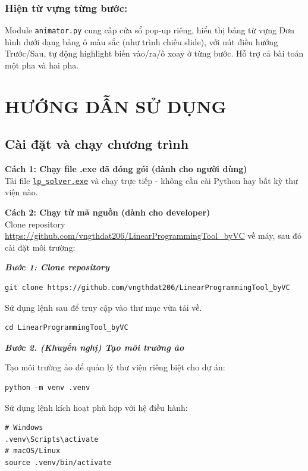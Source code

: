\documentclass[12pt,a4paper]{article}
\begin{document}
\subsubsection*{Hiện từ vựng từng bước:} Module \texttt{animator.py} cung cấp cửa sổ pop-up riêng, hiển thị bảng từ vựng Đơn hình dưới dạng bảng ô màu sắc (như trình chiếu slide), với nút điều hướng Trước/Sau, tự động highlight biến vào/ra/ô xoay ở từng bước. Hỗ trợ cả bài toán một pha và hai pha.

\section{HƯỚNG DẪN SỬ DỤNG}

\subsection{Cài đặt và chạy chương trình}

\noindent\textbf{Cách 1: Chạy file .exe đã đóng gói (dành cho người dùng)}\\
Tải file \href{https://drive.google.com/file/d/1MgmYg_NiuSky7lKlPjDzfYT9onzOd6Mu/view?usp=sharing}{\texttt{lp\_solver.exe}} và chạy trực tiếp - không cần cài Python hay bất kỳ thư viện nào.

\medskip
\noindent\textbf{Cách 2: Chạy từ mã nguồn (dành cho developer)}\\
Clone repository \url{https://github.com/vngthdat206/LinearProgrammingTool_byVC} về máy, sau đó cài đặt môi trường:

\textit{\textbf{Bước 1: Clone repository}}
\begin{verbatim}
git clone https://github.com/vngthdat206/LinearProgrammingTool_byVC
\end{verbatim}
Sử dụng lệnh sau để truy cập vào thư mục vừa tải về.
\begin{verbatim}
cd LinearProgrammingTool_byVC
\end{verbatim}

\textit{\textbf{Bước 2. (Khuyến nghị) Tạo môi trường ảo}}

\noindent Tạo môi trường ảo để quản lý thư viện riêng biệt cho dự án:
\begin{verbatim}
python -m venv .venv
\end{verbatim}
Sử dụng lệnh kích hoạt phù hợp với hệ điều hành:
\begin{verbatim}
# Windows
.venv\Scripts\activate
# macOS/Linux
source .venv/bin/activate
\end{verbatim}
\end{document}
